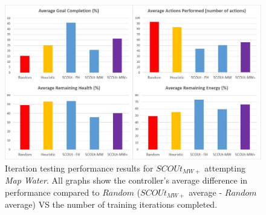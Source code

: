 \begin{figure}[H]
  \centering
  \includegraphics[width=1.0\columnwidth]{Figures/Results/Experiment2/AdditionalTraining/MapWaterPlus.JPG}
  \caption[Experiment 2 - Additional Training Testing Results: $SCOUt_{MW+}$]{Iteration testing performance results for $SCOUt_{MW+}$ attempting \textit{Map Water}. All graphs show the controller's average difference in performance compared to $Random$ ($SCOUt_{MW+}$ average - $Random$ average) VS the number of training iterations completed.}
  \label{fig:mapwaterplus_test_results}
\end{figure}



